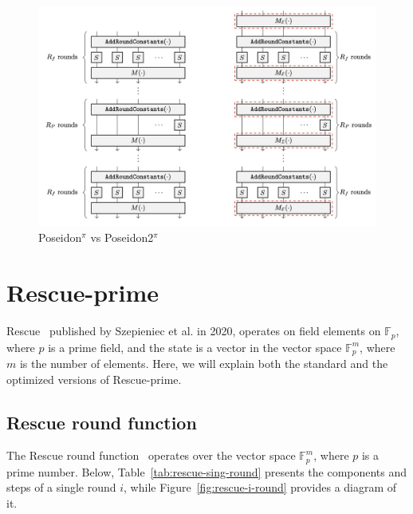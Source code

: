 \begin{figure}[htbp]
    \centering
    \includegraphics[width=\textwidth]{graphics/poseidon_vs_poseidon2.png}
    \caption{Poseidon$^\pi$ vs Poseidon2$^\pi$~\cite{grassi2023poseidon2}}
    \label{fig:poseidon-vs-2}
\end{figure}

\section{Rescue-prime}
\label{sec:Rescue-prime}
Rescue~\cite{szepieniec2020rescue} published by Szepieniec et al. in 2020, operates on field elements on $\mathbb{F}_{p}$, where $p$ is a prime field, and the state is a vector in the vector space $\mathbb{F}_{p}^m$, where $m$ is the number of elements. Here, we will explain both the standard and the optimized versions of Rescue-prime.

\subsection*{Rescue round function}
The Rescue round function~\cite{aly2020design} operates over the vector space $\mathbb{F}_p^{m}$, where $p$ is a prime number.
Below, Table~\ref{tab:rescue-sing-round} presents the components and steps of a single round $i$, while Figure~\ref{fig:rescue-i-round} provides a diagram of it.


